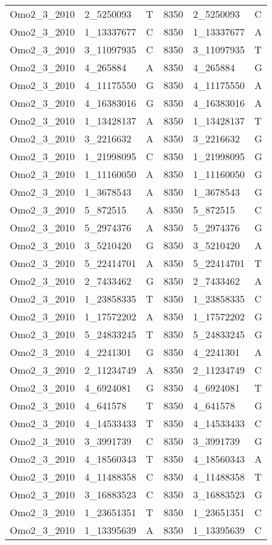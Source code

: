 \begin{center}
\begin{longtable}{|l|l|l|l|l|l|}
Omo2\_3\_2010&2\_5250093&T&8350&2\_5250093&C\\
Omo2\_3\_2010&1\_13337677&C&8350&1\_13337677&A\\
Omo2\_3\_2010&3\_11097935&C&8350&3\_11097935&T\\
Omo2\_3\_2010&4\_265884&A&8350&4\_265884&G\\
Omo2\_3\_2010&4\_11175550&G&8350&4\_11175550&A\\
Omo2\_3\_2010&4\_16383016&G&8350&4\_16383016&A\\
Omo2\_3\_2010&1\_13428137&A&8350&1\_13428137&T\\
Omo2\_3\_2010&3\_2216632&A&8350&3\_2216632&G\\
Omo2\_3\_2010&1\_21998095&C&8350&1\_21998095&G\\
Omo2\_3\_2010&1\_11160050&A&8350&1\_11160050&G\\
Omo2\_3\_2010&1\_3678543&A&8350&1\_3678543&G\\
Omo2\_3\_2010&5\_872515&A&8350&5\_872515&C\\
Omo2\_3\_2010&5\_2974376&A&8350&5\_2974376&G\\
Omo2\_3\_2010&3\_5210420&G&8350&3\_5210420&A\\
Omo2\_3\_2010&5\_22414701&A&8350&5\_22414701&T\\
Omo2\_3\_2010&2\_7433462&G&8350&2\_7433462&A\\
Omo2\_3\_2010&1\_23858335&T&8350&1\_23858335&C\\
Omo2\_3\_2010&1\_17572202&A&8350&1\_17572202&G\\
Omo2\_3\_2010&5\_24833245&T&8350&5\_24833245&G\\
Omo2\_3\_2010&4\_2241301&G&8350&4\_2241301&A\\
Omo2\_3\_2010&2\_11234749&A&8350&2\_11234749&C\\
Omo2\_3\_2010&4\_6924081&G&8350&4\_6924081&T\\
Omo2\_3\_2010&4\_641578&T&8350&4\_641578&G\\
Omo2\_3\_2010&4\_14533433&T&8350&4\_14533433&C\\
Omo2\_3\_2010&3\_3991739&C&8350&3\_3991739&G\\
Omo2\_3\_2010&4\_18560343&T&8350&4\_18560343&A\\
Omo2\_3\_2010&4\_11488358&C&8350&4\_11488358&T\\
Omo2\_3\_2010&3\_16883523&C&8350&3\_16883523&G\\
Omo2\_3\_2010&1\_23651351&T&8350&1\_23651351&C\\
Omo2\_3\_2010&1\_13395639&A&8350&1\_13395639&C\\

\end{longtable}
\end{center}
